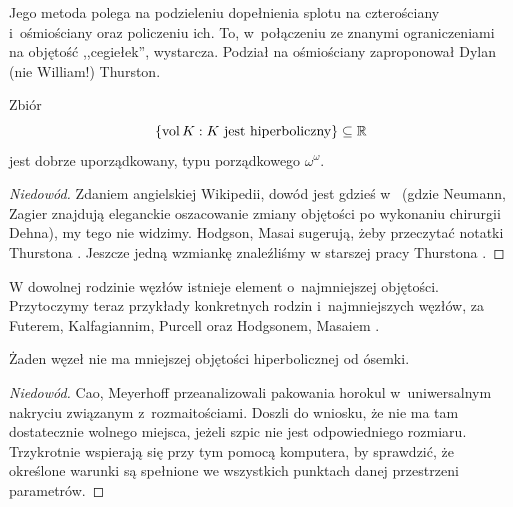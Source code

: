 Jego metoda polega na podzieleniu dopełnienia splotu na czterościany i~ośmiościany oraz policzeniu ich.
To, w~połączeniu ze znanymi ograniczeniami na objętość ,,cegiełek'', wystarcza.
Podział na ośmiościany zaproponował Dylan (nie William!) Thurston.
%

\begin{proposition}
    Zbiór
    \begin{equation}
        \{\operatorname{vol} K: K \textrm{ jest hiperboliczny}\} \subseteq \mathbb R
    \end{equation}
    jest dobrze uporządkowany, typu porządkowego $\omega^\omega$.
\end{proposition}

\begin{proof}[Niedowód]
    Zdaniem angielskiej Wikipedii, dowód jest gdzieś w~\cite{neumann1985} (gdzie Neumann, Zagier znajdują eleganckie oszacowanie zmiany objętości po wykonaniu chirurgii Dehna), my tego nie widzimy.
%
%
    Hodgson, Masai \cite{hodgson2013} sugerują, żeby przeczytać notatki Thurstona \cite{thurston2002}.
%
%
    Jeszcze jedną wzmiankę znaleźliśmy w starszej pracy Thurstona \cite[s. 365]{thurston1982}.
\end{proof}

W dowolnej rodzinie węzłów istnieje element o~najmniejszej objętości.
Przytoczymy teraz przykłady konkretnych rodzin i~najmniejszych węzłów, za Futerem, Kalfagiannim, Purcell \cite[s. 16-17]{purcell2019} oraz Hodgsonem, Masaiem \cite[s. 296]{hodgson2013}.
%
%
%
%
%

\begin{proposition}
%
%
\label{prp:eight_smallest_volume}%
    Żaden węzeł nie ma mniejszej objętości hiperbolicznej od ósemki.
\end{proposition}

\begin{proof}[Niedowód]
%
%
    Cao, Meyerhoff \cite{cao2001} przeanalizowali pakowania horokul w~uniwersalnym nakryciu związanym z~rozmaitościami.
    Doszli do wniosku, że nie ma tam dostatecznie wolnego miejsca, jeżeli szpic nie jest odpowiedniego rozmiaru.
%
    Trzykrotnie wspierają się przy tym pomocą komputera, by sprawdzić, że określone warunki są spełnione we wszystkich punktach danej przestrzeni parametrów.
\end{proof}


